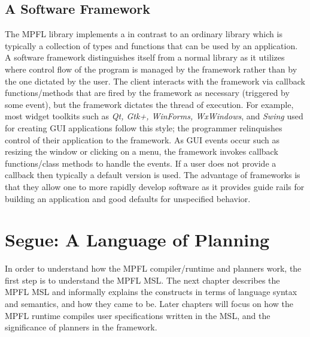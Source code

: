 \subsection{A Software Framework}
The MPFL library implements a  in contrast to an ordinary library which is typically a collection of types and functions that can be used by an application. A software framework distinguishes itself from a normal library as it utilizes  where control flow of the program is managed by the framework rather than by the one dictated by the user. The client interacts with the framework via callback functions/methods that are fired by the framework as necessary (triggered by some event), but the framework dictates the thread of execution. For example, most widget toolkits such as \textit{Qt, Gtk+, WinForms, WxWindows}, and \textit{Swing} used for creating GUI applications follow this style; the programmer relinquishes control of their application to the framework. As GUI events occur such as resizing the window or clicking on a menu, the framework invokes callback functions/class methods to handle the events. If a user does not provide a callback then typically a default version is used. The advantage of frameworks is that they allow one to more rapidly develop software as it provides guide rails for building an application and good defaults for unspecified behavior. 

\section{Segue: A Language of Planning}
In order to understand how the MPFL compiler/runtime and planners work, the first step is to understand the MPFL MSL. The next chapter describes the MPFL MSL and informally explains the constructs in terms of language syntax and semantics, and how they came to be. Later chapters will focus on how the MPFL runtime compiles user specifications written in the MSL, and the significance of planners in the framework.

